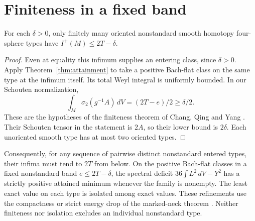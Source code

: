 \section{Finiteness in a fixed band}\label{sec:exact-band}

\begin{corollary}\label{cor:entered-type-attainment}
For each \(\delta>0\), only finitely many oriented nonstandard smooth
homotopy four-sphere types have \(I^+(M)\le 2T-\delta\).
\end{corollary}
\begin{proof}
Even at equality this infimum supplies an entering class, since
\(\delta>0\). Apply Theorem~\ref{thm:attainment} to take a positive
Bach-flat class on the same type at the infimum itself. Its total
Weyl integral is uniformly bounded. In our Schouten normalization,
\[
       \int_M\sigma_2(g^{-1}A)\,dV=(2T-e)/2\ge\delta/2 .
\]
These are the hypotheses of the finiteness theorem of Chang, Qing and
Yang \cite[Theorem B]{ChangQingYang2006Gap}. Their Schouten tensor in
the statement is \(2A\), so their lower bound is \(2\delta\).
Each unoriented smooth type has at most two oriented types.
\end{proof}

Consequently, for any sequence of pairwise distinct nonstandard entered types, their infima must tend to \(2T\) from below. On the positive
Bach-flat classes in a fixed nonstandard band \(e\le2T-\delta\), the spectral deficit
\(36\int L^2\,dV-Y^2\) has a strictly positive attained minimum whenever
the family is nonempty. The least exact value on each type is isolated
among exact values. These refinements use the compactness or strict
energy drop of the marked-neck theorem
\cite[First fixed-type critical value]{Baker2026MarkedNecks}
\cite[The spectral deficit of exact critical classes]{Baker2026FixedDescent}.
Neither finiteness nor isolation excludes an individual nonstandard type.
